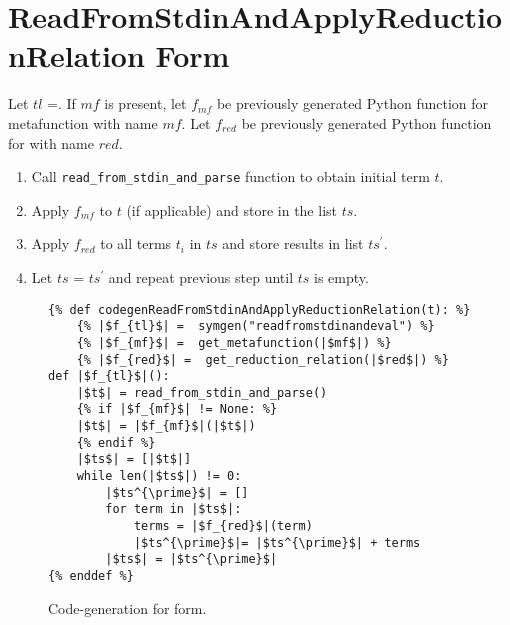 \section{ReadFromStdinAndApplyReductionRelation Form}

Let $tl$ =\ReadFromStdinAndApplyReductionRelation. If $mf$ is present, let $f_{mf}$ be previously generated Python function for metafunction with name $mf$. Let $f_{red}$ be previously generated Python function for \RedexMatchAssertEqualNoArgs \space with name $red$. 

\begin{enumerate}
\item Call \texttt{read\_from\_stdin\_and\_parse} function to obtain initial term $t$.
\item Apply $f_{mf}$ to $t$ (if applicable) and store in the list $ts$.
\item Apply $f_{red}$ to all terms $t_i$ in $ts$ and store results in list $ts^{\prime}$.
\item Let $ts$ = $ts^{\prime}$ and repeat previous step until $ts$ is empty.
\end{enumerate}

\begin{figure}
\begin{verbatim}
{% def codegenReadFromStdinAndApplyReductionRelation(t): %}
	{% |$f_{tl}$| =  symgen("readfromstdinandeval") %}
	{% |$f_{mf}$| =  get_metafunction(|$mf$|) %}
	{% |$f_{red}$| =  get_reduction_relation(|$red$|) %}
def |$f_{tl}$|():
	|$t$| = read_from_stdin_and_parse()
	{% if |$f_{mf}$| != None: %}
	|$t$| = |$f_{mf}$|(|$t$|)
	{% endif %}
    |$ts$| = [|$t$|]
    while len(|$ts$|) != 0:
        |$ts^{\prime}$| = []
        for term in |$ts$|:
            terms = |$f_{red}$|(term)
            |$ts^{\prime}$|= |$ts^{\prime}$| + terms 
        |$ts$| = |$ts^{\prime}$|
{% enddef %}
\end{verbatim}
\caption{Code-generation for \ReadFromStdinAndApplyReductionRelationNoArgs \space form.}
\label{codegen-repl}
\end{figure}
